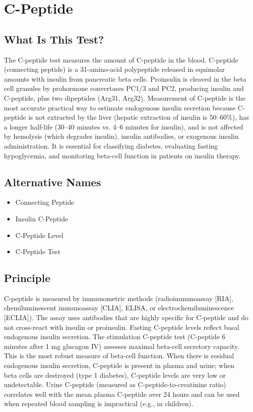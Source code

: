 \chapter{C-Peptide}

\section*{What Is This Test?}
The C-peptide test measures the amount of C-peptide in the blood. C-peptide (connecting peptide) is a 31-amino-acid polypeptide released in equimolar amounts with insulin from pancreatic beta cells. Proinsulin is cleaved in the beta cell granules by prohormone convertases PC1/3 and PC2, producing insulin and C-peptide, plus two dipeptides (Arg31, Arg32). Measurement of C-peptide is the most accurate practical way to estimate endogenous insulin secretion because C-peptide is not extracted by the liver (hepatic extraction of insulin is 50--60\%), has a longer half-life (30--40 minutes vs. 4--6 minutes for insulin), and is not affected by hemolysis (which degrades insulin), insulin antibodies, or exogenous insulin administration. It is essential for classifying diabetes, evaluating fasting hypoglycemia, and monitoring beta-cell function in patients on insulin therapy.

\section*{Alternative Names}
\begin{itemize}
  \item Connecting Peptide
  \item Insulin C-Peptide
  \item C-Peptide Level
  \item C-Peptide Test
\end{itemize}
\section*{Principle}
C-peptide is measured by immunometric methods (radioimmunoassay [RIA], chemiluminescent immunoassay [CLIA], ELISA, or electrochemiluminescence [ECLIA]). The assay uses antibodies that are highly specific for C-peptide and do not cross-react with insulin or proinsulin. Fasting C-peptide levels reflect basal endogenous insulin secretion. The stimulation C-peptide test (C-peptide 6 minutes after 1 mg glucagon IV) assesses maximal beta-cell secretory capacity. This is the most robust measure of beta-cell function. When there is residual endogenous insulin secretion, C-peptide is present in plasma and urine; when beta cells are destroyed (type 1 diabetes), C-peptide levels are very low or undetectable. Urine C-peptide (measured as C-peptide-to-creatinine ratio) correlates well with the mean plasma C-peptide over 24 hours and can be used when repeated blood sampling is impractical (e.g., in children).

